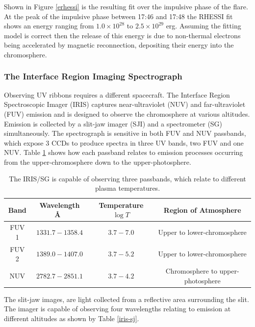 Shown in Figure \ref{erhessi} is the resulting fit over the impulsive phase of the flare. At the peak of the impulsive phase between 17:46 and 17:48 the RHESSI fit shows an energy ranging from $1.0{\times}10^{28}$ to $2.5{\times}10^{29}$ erg. Assuming the fitting model is correct then the release of this energy is due to non-thermal electrons being accelerated by magnetic reconnection, depositing their energy into the chromosphere. 



\subsubsection{The Interface Region Imaging Spectrograph}
Observing UV ribbons requires a different spacecraft. The Interface Region Spectroscopic Imager (IRIS) captures near-ultraviolet (NUV) and far-ultraviolet (FUV) emission and is designed to observe the chromosphere at various altitudes. Emission is collected by a slit-jaw imager (SJI) and a spectrometer (SG) simultaneously. The spectrograph is sensitive in both FUV and NUV passbands, which expose 3 CCDs to produce spectra in three UV bands, two FUV and one NUV. Table \ref{iris-sg} shows how each passband relates to emission processes occurring from the upper-chromosphere down to the upper-photosphere.

\begin{table}[H]
\centering
\begin{tabular}{|c|c|c|c|}
Band & Wavelength \AA\ & Temperature $\log{T}$ & Region of Atmosphere\\
\hline
FUV 1 & $1331.7 - 1358.4$ & $3.7 - 7.0$ & Upper to lower-chromosphere\\
FUV 2 & $1389.0 - 1407.0$ & $3.7 - 5.2$ & Upper to lower-chromosphere\\
NUV & $2782.7 - 2851.1$ & $3.7 - 4.2$ & Chromosphere to upper-photosphere\\
\end{tabular}
\caption{The IRIS/SG is capable of observing three passbands, which relate to different plasma temperatures.}\label{iris-sg}
\end{table}


The slit-jaw images, are light collected from a reflective area surrounding the slit. The imager is capable of observing four wavelengths relating to emission at different altitudes as shown by Table \ref{iris-sj}.


